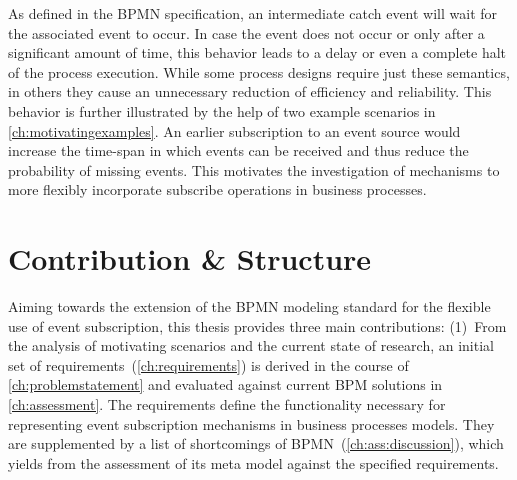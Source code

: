 As defined in the BPMN specification, an intermediate catch event will wait for the associated event to occur. In case the event does not occur or only after a significant amount of time, this behavior leads to a delay or even a complete halt of the process execution. %
While some process designs require just these semantics, in others they cause an unnecessary reduction of efficiency and reliability. %
This behavior is further illustrated by the help of two example scenarios in \autoref{ch:motivatingexamples}.
An earlier subscription to an event source would increase the time-span in which events can be received and thus reduce the probability of missing events.
This motivates the investigation of mechanisms to more flexibly incorporate subscribe operations in business processes.


\section{Contribution \& Structure}
Aiming towards the extension of the BPMN modeling standard for the flexible use of event subscription, this thesis provides three main contributions:
(1)~From the analysis of motivating scenarios and the current state of research, an initial set of requirements~(\autoref{ch:requirements}) is derived in the course of \autoref{ch:problemstatement} and evaluated against current BPM solutions in \autoref{ch:assessment}.
The requirements define the functionality necessary for representing event subscription mechanisms in business processes models. 
They are supplemented by a list of shortcomings of BPMN~(\autoref{ch:ass:discussion}), which yields from the assessment of its meta model against the specified requirements.


